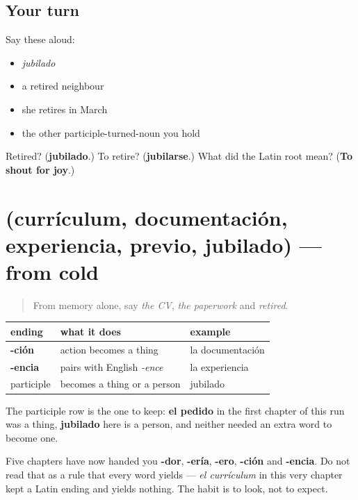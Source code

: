 \subsection*{Your turn}
Say these aloud:

\begin{itemize}
\raggedright
  \item \emph{jubilado}
  \item a retired neighbour
  \item she retires in March
  \item the other participle-turned-noun you hold
\end{itemize}

\begin{tcolorbox}[breakable,colback=teal!4,colframe=teal!35!black,title={Before you move on}]
Retired? (\textbf{jubilado}.) To retire? (\textbf{jubilarse}.) What did the Latin root mean? (\textbf{To shout for joy}.)
\end{tcolorbox}
\section[(currículum, documentación …]{(currículum, documentación, experiencia, previo, jubilado) — from cold}

\label{lesson:ES-R435-repaso-papeles}



\begin{quote}
From memory alone, say \emph{the CV}, \emph{the paperwork} and \emph{retired}.
\end{quote}

\begin{grammarlens}[title={Grammar Lens: the endings that read themselves}]
\noindent
\begin{tabularx}{\linewidth}{@{}>{\raggedright\arraybackslash}X>{\raggedright\arraybackslash}X>{\raggedright\arraybackslash}X@{}}
\toprule
\textbf{ending} & \textbf{what it does} & \textbf{example} \\
\midrule
\textbf{-ción} & action becomes a thing & la documentación \\
\textbf{-encia} & pairs with English \emph{-ence} & la experiencia \\
participle & becomes a thing or a person & jubilado \\
\bottomrule
\end{tabularx}

The participle row is the one to keep: \textbf{el pedido} in the first chapter of this run was a thing, \textbf{jubilado} here is a person, and neither needed an extra word to become one.

Five chapters have now handed you \textbf{-dor}, \textbf{-ería}, \textbf{-ero}, \textbf{-ción} and \textbf{-encia}. Do not read that as a rule that every word yields — \emph{el currículum} in this very chapter kept a Latin ending and yields nothing. The habit is to look, not to expect.
\end{grammarlens}

